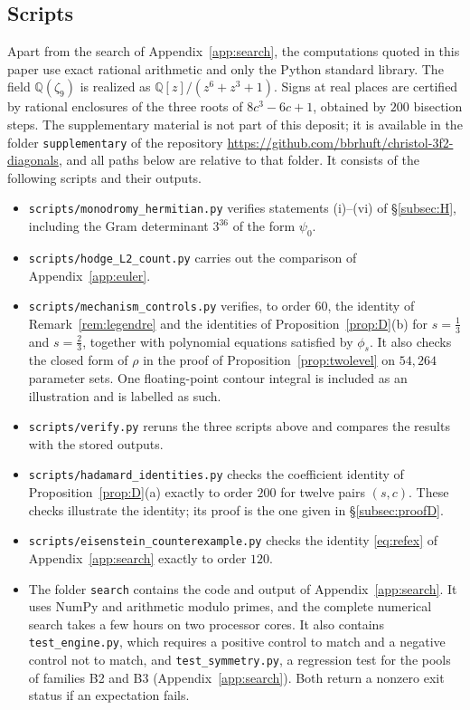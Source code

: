 \documentclass[11pt]{amsart}
\theoremstyle{definition}
\theoremstyle{remark}
\numberwithin{equation}{section}
\newcommand{\Q}{\mathbb{Q}}
\begin{document}
\subsection*{Scripts}
Apart from the search of Appendix~\ref{app:search}, the computations quoted in this paper use exact rational arithmetic and only the Python standard library. The field $\Q(\zeta_9)$ is realized as $\Q[z]/(z^6+z^3+1)$. Signs at real places are certified by rational enclosures of the three roots of $8c^3-6c+1$, obtained by $200$ bisection steps. The supplementary material is not part of this deposit; it is available in the folder \texttt{supplementary} of the repository \url{https://github.com/bbrhuft/christol-3f2-diagonals}, and all paths below are relative to that folder. It consists of the following scripts and their outputs.
\begin{itemize}[leftmargin=2em]
\item \texttt{scripts/monodromy\_hermitian.py} verifies statements (i)--(vi) of \S\ref{subsec:H}, including the Gram determinant $3^{36}$ of the form $\psi_0$.
\item \texttt{scripts/hodge\_L2\_count.py} carries out the comparison of Appendix~\ref{app:euler}.
\item \texttt{scripts/mechanism\_controls.py} verifies, to order $60$, the identity of Remark~\ref{rem:legendre} and the identities of Proposition~\ref{prop:D}(b) for $s=\frac13$ and $s=\frac23$, together with polynomial equations satisfied by $\phi_s$. It also checks the closed form of $\rho$ in the proof of Proposition~\ref{prop:twolevel} on $54{,}264$ parameter sets. One floating-point contour integral is included as an illustration and is labelled as such.
\item \texttt{scripts/verify.py} reruns the three scripts above and compares the results with the stored outputs.
\item \texttt{scripts/hadamard\_identities.py} checks the coefficient identity of Proposition~\ref{prop:D}(a) exactly to order $200$ for twelve pairs $(s,c)$. These checks illustrate the identity; its proof is the one given in \S\ref{subsec:proofD}.
\item \texttt{scripts/eisenstein\_counterexample.py} checks the identity \eqref{eq:refex} of Appendix~\ref{app:search} exactly to order $120$.
\item The folder \texttt{search} contains the code and output of Appendix~\ref{app:search}. It uses NumPy and arithmetic modulo primes, and the complete numerical search takes a few hours on two processor cores. It also contains \texttt{test\_engine.py}, which requires a positive control to match and a negative control not to match, and \texttt{test\_symmetry.py}, a regression test for the pools of families B2 and B3 (Appendix~\ref{app:search}). Both return a nonzero exit status if an expectation fails.

\end{itemize}
\end{document}
